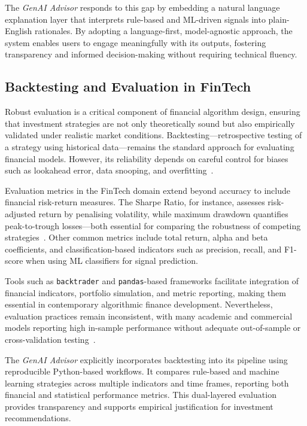 The \textit{GenAI Advisor} responds to this gap by embedding a natural language explanation layer that interprets rule-based and ML-driven signals into plain-English rationales. By adopting a language-first, model-agnostic approach, the system enables users to engage meaningfully with its outputs, fostering transparency and informed decision-making without requiring technical fluency.

\subsection{Backtesting and Evaluation in FinTech}

Robust evaluation is a critical component of financial algorithm design, ensuring that investment strategies are not only theoretically sound but also empirically validated under realistic market conditions. Backtesting—retrospective testing of a strategy using historical data—remains the standard approach for evaluating financial models. However, its reliability depends on careful control for biases such as lookahead error, data snooping, and overfitting~\cite{bailey2014backtest}.

Evaluation metrics in the FinTech domain extend beyond accuracy to include financial risk-return measures. The Sharpe Ratio, for instance, assesses risk-adjusted return by penalising volatility, while maximum drawdown quantifies peak-to-trough losses—both essential for comparing the robustness of competing strategies~\cite{lo2002sharpe}. Other common metrics include total return, alpha and beta coefficients, and classification-based indicators such as precision, recall, and F1-score when using ML classifiers for signal prediction.

Tools such as \texttt{backtrader} and \texttt{pandas}-based frameworks facilitate integration of financial indicators, portfolio simulation, and metric reporting, making them essential in contemporary algorithmic finance development. Nevertheless, evaluation practices remain inconsistent, with many academic and commercial models reporting high in-sample performance without adequate out-of-sample or cross-validation testing~\cite{kaastra1996forecasting}.

The \textit{GenAI Advisor} explicitly incorporates backtesting into its pipeline using reproducible Python-based workflows. It compares rule-based and machine learning strategies across multiple indicators and time frames, reporting both financial and statistical performance metrics. This dual-layered evaluation provides transparency and supports empirical justification for investment recommendations.

